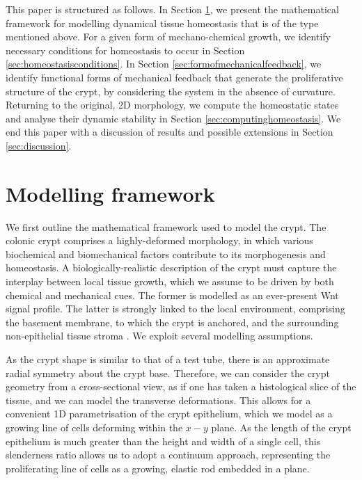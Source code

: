 This paper is structured as follows. In Section \ref{sec:modellingframework}, we present the mathematical framework for modelling dynamical tissue homeostasis that is of the type mentioned above. %
For a given form of mechano-chemical growth, we identify necessary conditions for homeostasis to occur in Section \ref{sec:homeostasisconditions}. In Section \ref{sec:formofmechanicalfeedback}, we identify functional forms of mechanical feedback that generate the proliferative structure of the crypt, by considering the system in the absence of curvature. Returning to the original, 2D morphology, we compute the homeostatic states and analyse their dynamic stability in Section \ref{sec:computinghomeostasis}. We end this paper with a discussion of results and possible extensions in Section \ref{sec:discussion}.

\section{Modelling framework}
\label{sec:modellingframework}
We first outline the mathematical framework used to model the crypt. The colonic crypt comprises a highly-deformed morphology, in which various biochemical and biomechanical factors contribute to its morphogenesis and homeostasis. A biologically-realistic description of the crypt must capture the interplay between local tissue growth, which we assume to be driven by both chemical and mechanical cues. The former is modelled as an ever-present Wnt signal profile. The latter is strongly linked to the local environment, comprising the basement membrane, to which the crypt is anchored, and the surrounding non-epithelial tissue stroma \cite{meran2017intestinal}. We exploit several modelling assumptions.

As the crypt shape is similar to that of a test tube, there is an approximate radial symmetry about the crypt base. Therefore, we can consider the crypt geometry from a cross-sectional view, as if one has taken a histological slice of the tissue, and we can model the transverse deformations. This allows for a convenient 1D parametrisation of the crypt epithelium, which we model as a growing line of cells deforming within the $x-y$ plane. As the length of the crypt epithelium is much greater than the height and width of a single cell, this slenderness ratio allows us to adopt a continuum approach, representing the proliferating line of cells as a growing, elastic rod embedded in a plane. 

